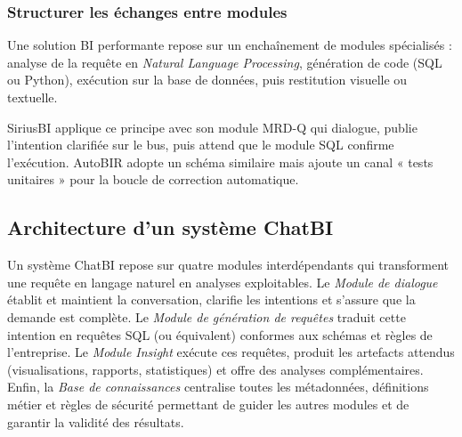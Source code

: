\documentclass[conference]{IEEEtran}
\begin{document}
\subsubsection{Structurer les échanges entre modules}

Une solution BI performante repose sur un enchaînement de modules spécialisés : analyse de la requête en \textit{Natural Language Processing}, génération de code (SQL ou Python), exécution sur la base de données, puis restitution visuelle ou textuelle.

SiriusBI \citep{jiang2024siriusbi} applique ce principe avec son module MRD-Q qui dialogue, publie l’intention clarifiée sur le bus, puis attend que le module SQL confirme l’exécution.  AutoBIR \citep{busany2024autobir} adopte un schéma similaire mais ajoute un canal « tests unitaires » pour la boucle de correction automatique.

\subsection{Architecture d’un système ChatBI}
\label{sec:architecture_chatbi}

Un système ChatBI repose sur quatre modules interdépendants qui transforment une requête en langage naturel en analyses exploitables. Le \emph{Module de dialogue} établit et maintient la conversation, clarifie les intentions et s’assure que la demande est complète. Le \emph{Module de génération de requêtes} traduit cette intention en requêtes SQL (ou équivalent) conformes aux schémas et règles de l’entreprise. Le \emph{Module Insight} exécute ces requêtes, produit les artefacts attendus (visualisations, rapports, statistiques) et offre des analyses complémentaires. Enfin, la \emph{Base de connaissances} centralise toutes les métadonnées, définitions métier et règles de sécurité permettant de guider les autres modules et de garantir la validité des résultats.
\end{document}
